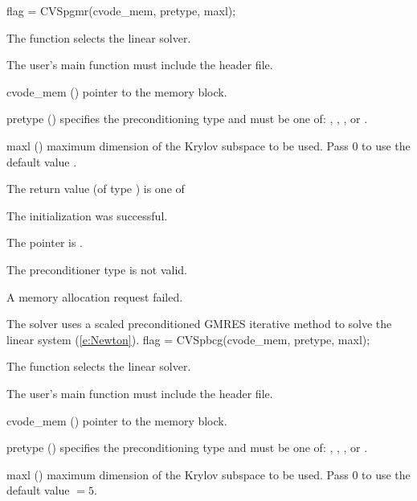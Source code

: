 {
  flag = CVSpgmr(cvode\_mem, pretype, maxl);
}
{
  The function  selects the {\cvspgmr} linear solver. 

  The user's main function must include the  header file.
}
{
  \begin{args}
  \item[cvode\_mem] ()
    pointer to the {\cvodes} memory block.
  \item[pretype] ()
    specifies the preconditioning type and must be one of: 
    , , , or .
  \item[maxl] ()
    maximum dimension of the Krylov subspace to be used. Pass $0$ to use the 
    default value .
  \end{args}
}
{
  The return value  (of type ) is one of
  \begin{args}
  \item[\Id{CVSPGMR\_SUCCESS}] 
    The {\cvspgmr} initialization was successful.
  \item[\Id{CVSPGMR\_MEM\_NULL}]
    The  pointer is .
  \item[\Id{CVSPGMR\_ILL\_INPUT}]
    The preconditioner type  is not valid.
  \item[\Id{CVSPGMR\_MEM\_FAIL}]
    A memory allocation request failed.
  \end{args}
}
{
  The {\cvspgmr} solver uses a scaled preconditioned GMRES
  iterative method to solve the linear system (\ref{e:Newton}).
}
{
  flag = CVSpbcg(cvode\_mem, pretype, maxl);
}
{
  The function  selects the {\cvspbcg} linear solver. 

  The user's main function must include the  header file.
}
{
  \begin{args}
  \item[cvode\_mem] ()
    pointer to the {\cvodes} memory block.
  \item[pretype] ()
    specifies the preconditioning type and must be one of: 
    , , , or .
  \item[maxl] ()
    maximum dimension of the Krylov subspace to be used. Pass $0$ to use the 
    default value  $= 5$.
  \end{args}
}

